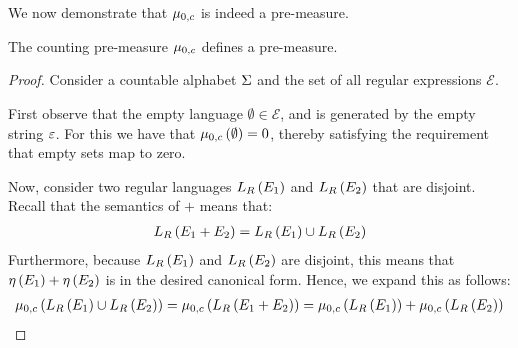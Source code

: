 We now demonstrate that \(\mu_{0, c}\) is indeed a pre-measure.

\begin{theorem}
  The counting pre-measure \(\mu_{0, c}\) defines a pre-measure.
\end{theorem}
\begin{proof}
  Consider a countable alphabet \(\Sigma\) and the set of all
  regular expressions \(\mathcal{E}\).

  First observe that the empty language \(\emptyset \in \mathcal{E}\),
  and is generated by the empty string \(\varepsilon\).
  For this we have that \(\mu_{0, c}\left(\emptyset\right) = 0\),
  thereby satisfying the requirement that empty sets map to zero.
  
  Now, consider two regular languages
  \(L_{R}\left(E_1\right)\) and \(L_{R}\left(E_2\right)\)
  that are disjoint.
  Recall that the semantics of \(+\) means that:
  \begin{align*}
    L_{R}\left(E_1 + E_2\right) =
      L_{R}\left(E_1\right) \cup L_{R}\left(E_2\right)
  \end{align*}
  Furthermore, because \(L_{R}\left(E_1\right)\) and
  \(L_{R}\left(E_2\right)\) are disjoint, this means that
  \(\eta\left(E_1\right) + \eta\left(E_2\right)\) is in
  the desired canonical form.
  Hence, we expand this as follows:
  \begin{align*}
    \mu_{0, c}
      \left(L_{R}\left(E_1\right) \cup L_{R}\left(E_2\right)\right)
      = \mu_{0, c}\left(L_{R}\left(E_1 + E_2\right)\right)
      = \mu_{0, c}\left(L_{R}\left(E_1\right)\right) +
        \mu_{0, c}\left(L_{R}\left(E_2\right)\right)
  \end{align*}

\end{proof}



